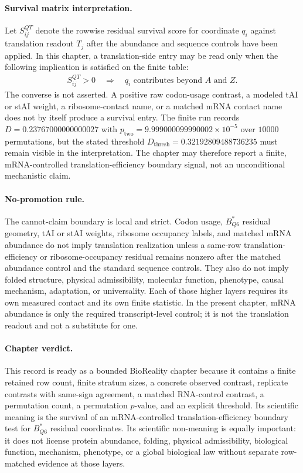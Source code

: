 \paragraph{Survival matrix interpretation.}
Let $S^{QT}_{ij}$ denote the rowwise residual survival score for coordinate $q_i$ against translation readout $T_j$ after the abundance and sequence controls have been applied. In this chapter, a translation-side entry may be read only when the following implication is satisfied on the finite table:
$$
\begin{aligned}
  S^{QT}_{ij} > 0
  \quad\Rightarrow\quad
  q_i \text{ contributes beyond } A \text{ and } Z.
\end{aligned}
$$
The converse is not asserted. A positive raw codon-usage contrast, a modeled tAI or stAI weight, a ribosome-contact name, or a matched mRNA contact name does not by itself produce a survival entry. The finite run records $D=0.23767000000000027$ with $p_{\mathrm{two}}=9.999000099990002\times 10^{-5}$ over $10000$ permutations, but the stated threshold $D_{\mathrm{thresh}}=0.32192809488736235$ must remain visible in the interpretation. The chapter may therefore report a finite, mRNA-controlled translation-efficiency boundary signal, not an unconditional mechanistic claim.

\paragraph{No-promotion rule.}
The cannot-claim boundary is local and strict. Codon usage, $B^{\ast}_{Q6}$ residual geometry, tAI or stAI weights, ribosome occupancy labels, and matched mRNA abundance do not imply translation realization unless a same-row translation-efficiency or ribosome-occupancy residual remains nonzero after the matched abundance control and the standard sequence controls. They also do not imply folded structure, physical admissibility, molecular function, phenotype, causal mechanism, adaptation, or universality. Each of those higher layers requires its own measured contact and its own finite statistic. In the present chapter, mRNA abundance is only the required transcript-level control; it is not the translation readout and not a substitute for one.

\paragraph{Chapter verdict.}
This record is ready as a bounded BioReality chapter because it contains a finite retained row count, finite stratum sizes, a concrete observed contrast, replicate contrasts with same-sign agreement, a matched RNA-control contrast, a permutation count, a permutation $p$-value, and an explicit threshold. Its scientific meaning is the survival of an mRNA-controlled translation-efficiency boundary test for $B^{\ast}_{Q6}$ residual coordinates. Its scientific non-meaning is equally important: it does not license protein abundance, folding, physical admissibility, biological function, mechanism, phenotype, or a global biological law without separate row-matched evidence at those layers.
